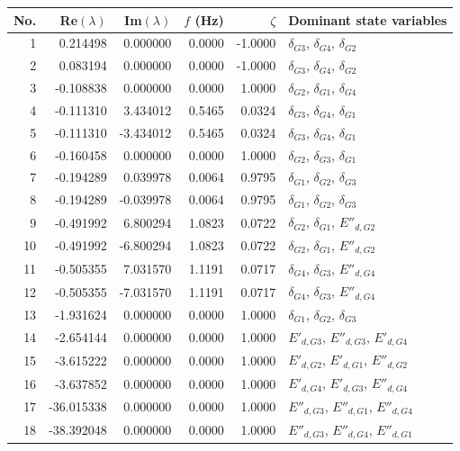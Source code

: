\begingroup\scriptsize\setlength{\tabcolsep}{4pt}
\begin{tabular}{r r r r r p{4.5cm}}
\toprule
No. & Re$(\lambda)$ & Im$(\lambda)$ & $f$ (Hz) & $\zeta$ & Dominant state variables\\
\midrule
1 & 0.214498 & 0.000000 & 0.0000 & -1.0000 & $\delta_{G3}$, $\delta_{G4}$, $\delta_{G2}$\\
2 & 0.083194 & 0.000000 & 0.0000 & -1.0000 & $\delta_{G3}$, $\delta_{G4}$, $\delta_{G2}$\\
3 & -0.108838 & 0.000000 & 0.0000 & 1.0000 & $\delta_{G2}$, $\delta_{G1}$, $\delta_{G4}$\\
4 & -0.111310 & 3.434012 & 0.5465 & 0.0324 & $\delta_{G3}$, $\delta_{G4}$, $\delta_{G1}$\\
5 & -0.111310 & -3.434012 & 0.5465 & 0.0324 & $\delta_{G3}$, $\delta_{G4}$, $\delta_{G1}$\\
6 & -0.160458 & 0.000000 & 0.0000 & 1.0000 & $\delta_{G2}$, $\delta_{G3}$, $\delta_{G1}$\\
7 & -0.194289 & 0.039978 & 0.0064 & 0.9795 & $\delta_{G1}$, $\delta_{G2}$, $\delta_{G3}$\\
8 & -0.194289 & -0.039978 & 0.0064 & 0.9795 & $\delta_{G1}$, $\delta_{G2}$, $\delta_{G3}$\\
9 & -0.491992 & 6.800294 & 1.0823 & 0.0722 & $\delta_{G2}$, $\delta_{G1}$, $E''_{d,G2}$\\
10 & -0.491992 & -6.800294 & 1.0823 & 0.0722 & $\delta_{G2}$, $\delta_{G1}$, $E''_{d,G2}$\\
11 & -0.505355 & 7.031570 & 1.1191 & 0.0717 & $\delta_{G4}$, $\delta_{G3}$, $E''_{d,G4}$\\
12 & -0.505355 & -7.031570 & 1.1191 & 0.0717 & $\delta_{G4}$, $\delta_{G3}$, $E''_{d,G4}$\\
13 & -1.931624 & 0.000000 & 0.0000 & 1.0000 & $\delta_{G1}$, $\delta_{G2}$, $\delta_{G3}$\\
14 & -2.654144 & 0.000000 & 0.0000 & 1.0000 & $E'_{d,G3}$, $E''_{d,G3}$, $E'_{d,G4}$\\
15 & -3.615222 & 0.000000 & 0.0000 & 1.0000 & $E'_{d,G2}$, $E'_{d,G1}$, $E''_{d,G2}$\\
16 & -3.637852 & 0.000000 & 0.0000 & 1.0000 & $E'_{d,G4}$, $E'_{d,G3}$, $E''_{d,G4}$\\
17 & -36.015338 & 0.000000 & 0.0000 & 1.0000 & $E''_{d,G3}$, $E''_{d,G1}$, $E''_{d,G4}$\\
18 & -38.392048 & 0.000000 & 0.0000 & 1.0000 & $E''_{d,G3}$, $E''_{d,G4}$, $E''_{d,G1}$\\

\end{tabular}
